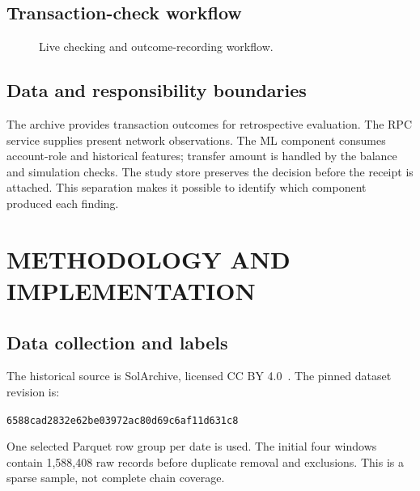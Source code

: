 \documentclass[12pt,a4paper,oneside]{report}
\begin{document}
\section{Transaction-check workflow}
\begin{figure}[ht]\centering
{}\caption{Live checking and outcome-recording workflow.}\end{figure}
\section{Data and responsibility boundaries}
The archive provides transaction outcomes for retrospective evaluation. The RPC service supplies present network observations. The ML component consumes account-role and historical features; transfer amount is handled by the balance and simulation checks. The study store preserves the decision before the receipt is attached. This separation makes it possible to identify which component produced each finding.
\chapter{METHODOLOGY AND IMPLEMENTATION}
\section{Data collection and labels}
The historical source is SolArchive, licensed CC BY 4.0~\cite{archive}. The pinned dataset revision is:\par
{\small\texttt{6588cad2832e62be03972ac80d69c6af11d631c8}}\par
 One selected Parquet row group per date is used. The initial four windows contain 1,588,408 raw records before duplicate removal and exclusions. This is a sparse sample, not complete chain coverage.
\end{document}
